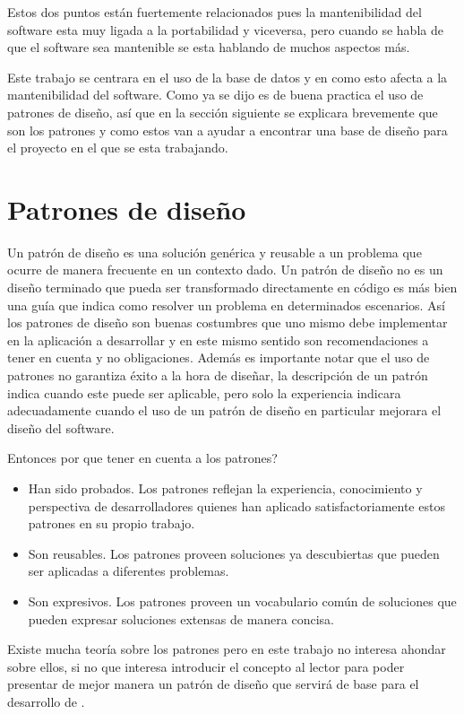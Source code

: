 %
Estos dos puntos están fuertemente relacionados pues la mantenibilidad del software esta muy ligada a la portabilidad y viceversa, pero cuando se habla de que el software sea mantenible se esta hablando de muchos aspectos más.

Este trabajo se centrara en el uso de la base de datos y en como esto afecta a la mantenibilidad del software. Como ya se dijo es de buena practica el uso de patrones de diseño, así que en la sección siguiente  se explicara brevemente que son los patrones y como estos van a ayudar a encontrar una base de diseño para el proyecto en el que se esta trabajando. 
%
%
\section{Patrones de diseño}
%
Un patrón de diseño es una solución genérica y reusable  a un problema que ocurre de manera frecuente en un contexto dado. Un patrón de diseño no es un diseño terminado que pueda ser transformado directamente en código es más bien una guía que indica como resolver un problema en determinados escenarios. Así los patrones de diseño son buenas costumbres que uno mismo debe implementar en la aplicación a desarrollar y en este mismo sentido son recomendaciones a tener en cuenta y no obligaciones\cite{Metsker:2002:DPJ}. Además es importante notar que el uso de patrones no garantiza éxito a la hora de diseñar, la descripción de un patrón indica cuando este puede ser aplicable, pero solo la experiencia indicara adecuadamente cuando el uso de un patrón de diseño en particular mejorara el diseño del software\cite{java:patrones}.

Entonces por que tener en cuenta a los patrones?
\begin{itemize}
\item Han sido probados. Los patrones reflejan la experiencia, conocimiento y perspectiva de desarrolladores quienes han aplicado satisfactoriamente estos patrones en su propio trabajo.
%
\item Son reusables. Los patrones proveen soluciones ya descubiertas que pueden ser aplicadas a diferentes problemas.
%
\item Son expresivos. Los patrones proveen un vocabulario común de soluciones que pueden expresar soluciones extensas de manera concisa.
\end{itemize}

Existe mucha teoría sobre los patrones pero en este trabajo no interesa ahondar sobre ellos, si no que interesa introducir el concepto al lector para poder presentar de mejor manera un patrón de diseño que servirá de base para el desarrollo de \jj.
%
